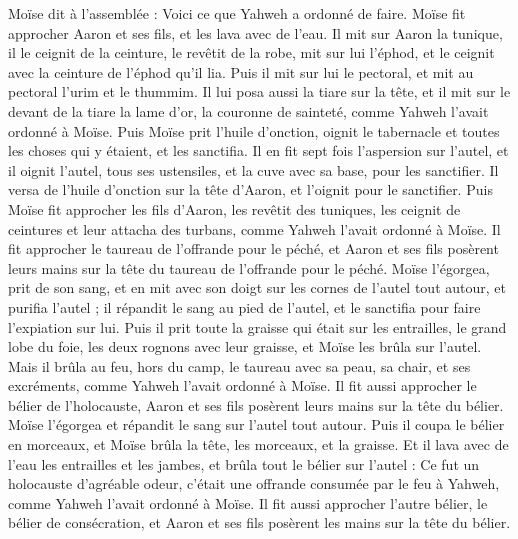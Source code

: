 \begin{multicols}{2}
Moïse dit à l'assemblée : Voici ce que Yahweh a ordonné de faire.
Moïse fit approcher Aaron et ses fils, et les lava avec de l'eau.
Il mit sur Aaron la tunique, il le ceignit de la ceinture, le revêtit de la robe, mit sur lui l'éphod, et le ceignit avec la ceinture de l'éphod qu’il lia.
Puis il mit sur lui le pectoral, et mit au pectoral l’urim et le thummim.
Il lui posa aussi la tiare sur la tête, et il mit sur le devant de la tiare la lame d'or, la couronne de sainteté, comme Yahweh l'avait ordonné à Moïse.
Puis Moïse prit l'huile d'onction, oignit le tabernacle et toutes les choses qui y étaient, et les sanctifia.
Il en fit sept fois l’aspersion sur l'autel, et il oignit l'autel, tous ses ustensiles, et la cuve avec sa base, pour les sanctifier.
Il versa de l'huile d'onction sur la tête d'Aaron, et l'oignit pour le sanctifier.
Puis Moïse fit approcher les fils d'Aaron, les revêtit des tuniques, les ceignit de ceintures et leur attacha des turbans, comme Yahweh l'avait ordonné à Moïse.
Il fit approcher le taureau de l'offrande pour le péché, et Aaron et ses fils posèrent leurs mains sur la tête du taureau de l'offrande pour le péché.
Moïse l’égorgea, prit de son sang, et en mit avec son doigt sur les cornes de l'autel tout autour, et purifia l'autel ; il répandit le sang au pied de l'autel, et le sanctifia pour faire l’expiation sur lui.
Puis il prit toute la graisse qui était sur les entrailles, le grand lobe du foie, les deux rognons avec leur graisse, et Moïse les brûla sur l'autel.
Mais il brûla au feu, hors du camp, le taureau avec sa peau, sa chair, et ses excréments, comme Yahweh l'avait ordonné à Moïse.
Il fit aussi approcher le bélier de l'holocauste, Aaron et ses fils posèrent leurs mains sur la tête du bélier.
Moïse l'égorgea et répandit le sang sur l'autel tout autour.
Puis il coupa le bélier en morceaux, et Moïse brûla la tête, les morceaux, et la graisse.
Et il lava avec de l'eau les entrailles et les jambes, et brûla tout le bélier sur l'autel : Ce fut un holocauste d’agréable odeur, c'était une offrande consumée par le feu à Yahweh, comme Yahweh l'avait ordonné à Moïse.
Il fit aussi approcher l'autre bélier, le bélier de consécration, et Aaron et ses fils posèrent les mains sur la tête du bélier.

\end{multicols}
